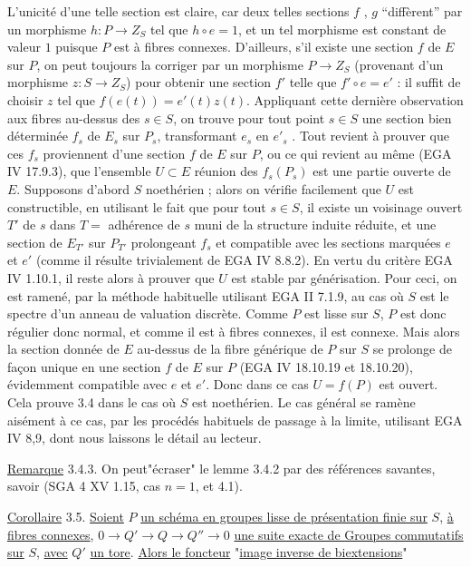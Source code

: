 L'unicité d'une telle section est claire, car deux telles sections $f$ , $g$ ``diffèrent'' par un morphisme $h : P \longrightarrow Z_{S}$ tel que $h \circ e = 1$, et un tel morphisme est constant de valeur $1$ puisque $P$ est à fibres connexes. D'ailleurs, s'il existe une section $f$ de $E$ sur $P$, on peut toujours la corriger par un morphisme $P \longrightarrow Z_{S}$ (provenant d'un morphisme $z : S \longrightarrow Z_{S}$) pour obtenir une section $f'$ telle que $f' \circ e = e'$ : il suffit de choisir $z$ tel que $f(e(t)) = e'(t)z(t)$. Appliquant cette dernière observation aux fibres au-dessus des $s \in S$, on trouve pour tout point $s \in S$ une section bien déterminée $f_{s}$ de $E_{s}$ sur $P_{s}$, transformant $e_{s}$ en $e'_{s}$ . Tout revient à prouver que ces $f_{s}$ proviennent d'une section $f$ de $E$ sur $P$, ou ce qui revient au même (EGA IV 17.9.3), que l'ensemble $U \subset E$ réunion des $f_{s}(P_{s})$ est une partie ouverte de $E$. Supposons d'abord $S$ noethérien ; alors on vérifie facilement que $U$ est constructible, en utilisant le fait que pour tout $s \in S$, il existe un voisinage ouvert $T'$ de $s$ dans $T = {}$ adhérence de $s$ muni de la structure induite réduite, et une section de $E_{T'}$ sur $P_{T'}$ prolongeant $f_{s}$ et compatible avec les sections marquées $e$ et $e'$ (comme il résulte trivialement de EGA IV 8.8.2). En vertu du critère EGA IV 1.10.1, il reste alors à prouver que $U$ est stable par générisation. Pour ceci, on est ramené, par la méthode habituelle utilisant EGA II 7.1.9, au cas où $S$ est le spectre d'un anneau de valuation discrète. Comme $P$ est lisse sur $S$,
$P$ est donc régulier donc normal, et comme il est à fibres connexes, il est connexe. Mais alors la section donnée de $E$ au-dessus de la fibre générique de $P$ sur $S$ se prolonge de façon unique en une section $f$ de $E$ sur $P$ (EGA IV 18.10.19 et 18.10.20), évidemment compatible avec $e$ et $e'$. Donc dans ce cas $U = f(P)$ est ouvert. Cela prouve 3.4 dans le cas où $S$ est noethérien. Le cas général se ramène aisément à ce cas, par les procédés habituels de passage à la limite, utilisant EGA IV 8,9, dont nous laissons le détail au lecteur.

\underline{Remarque} 3.4.3. On peut"écraser" le lemme 3.4.2 par des références savantes, savoir (SGA 4 XV 1.15, cas $n=1$, et 4.1).

\underline{Corollaire} 3.5. \underline{Soient} $P$ \underline{un schéma en groupes lisse de présentation finie sur} $S$, \underline{à fibres connexes}, $0 \longrightarrow Q' \longrightarrow Q \longrightarrow Q'' \longrightarrow 0$ \underline{une suite exacte de Groupes commutatifs sur} $S$, \underline{avec} $Q'$ \underline{un tore}. \underline{Alors le foncteur} "\underline{image inverse de biextensions}"

